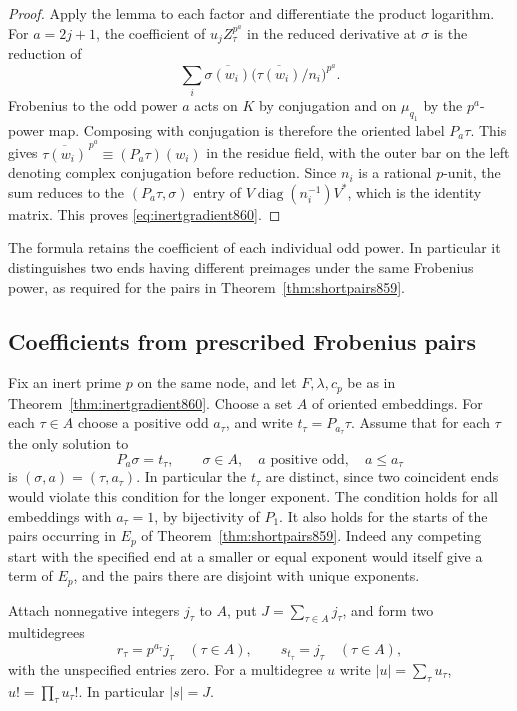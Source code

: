 \documentclass[a4paper,11pt]{article}
\theoremstyle{definition}
\theoremstyle{remark}
\numberwithin{equation}{section}
\begin{document}
\begin{proof}
Apply the lemma to each factor and differentiate the product
logarithm. For \(a=2j+1\), the coefficient of \(u_j Z_\tau^{p^a}\)
in the reduced derivative at \(\sigma\) is the reduction of
\[
       \sum_i \overline{\sigma(w_i)}
                     \bigl(\overline{\tau(w_i)}/n_i\bigr)^{p^a}.
\]
Frobenius to the odd power \(a\) acts on \(K\) by conjugation
and on \(\mu_{q_1}\) by the \(p^a\)-power map. Composing with
conjugation is therefore the oriented label \(P_a\tau\).
This gives
\(\overline{\tau(w_i)}^{\,p^a}\equiv(P_a\tau)(w_i)\) in the
residue field, with the outer bar on the left denoting complex
conjugation before reduction. Since \(n_i\) is a rational
\(p\)-unit, the sum reduces to the \((P_a\tau,\sigma)\) entry
of \(V\operatorname{diag}(n_i^{-1})V^*\), which is the identity
matrix. This proves \eqref{eq:inertgradient860}.
\end{proof}

The formula retains the coefficient of each individual odd
power. In particular it distinguishes two ends having different
preimages under the same Frobenius power, as required for the
pairs in Theorem~\ref{thm:shortpairs859}.
\clearpage

\subsection{Coefficients from prescribed Frobenius pairs}
\label{sec:pairedtable861}
Fix an inert prime \(p\) on the same node, and let \(F,\lambda,c_p\)
be as in Theorem~\ref{thm:inertgradient860}. Choose a set \(A\)
of oriented embeddings. For each \(\tau\in A\) choose a positive
odd \(a_\tau\), and write \(t_\tau=P_{a_\tau}\tau\). Assume
that for each \(\tau\) the only solution to
\[
     P_a\sigma=t_\tau,\qquad \sigma\in A,\quad
                    a\text{ positive odd},\quad a\le a_\tau
\]
is \((\sigma,a)=(\tau,a_\tau)\). In particular the \(t_\tau\)
are distinct, since two coincident ends would violate this
condition for the longer exponent. The condition holds for all
embeddings with \(a_\tau=1\), by bijectivity of \(P_1\).
It also holds for the starts of the pairs occurring in
\(E_p\) of Theorem~\ref{thm:shortpairs859}. Indeed any competing
start with the specified end at a smaller or equal exponent
would itself give a term of \(E_p\), and the pairs there
are disjoint with unique exponents.

Attach nonnegative integers \(j_\tau\) to \(A\), put
\(J=\sum_{\tau\in A}j_\tau\), and form two multidegrees
\[
   r_\tau=p^{a_\tau}j_\tau\quad(\tau\in A),\qquad
   s_{t_\tau}=j_\tau\quad(\tau\in A),
\]
with the unspecified entries zero. For a multidegree \(u\)
write \(|u|=\sum_\tau u_\tau\), \(u!=\prod_\tau u_\tau!\).
In particular \(|s|=J\).
\end{document}
